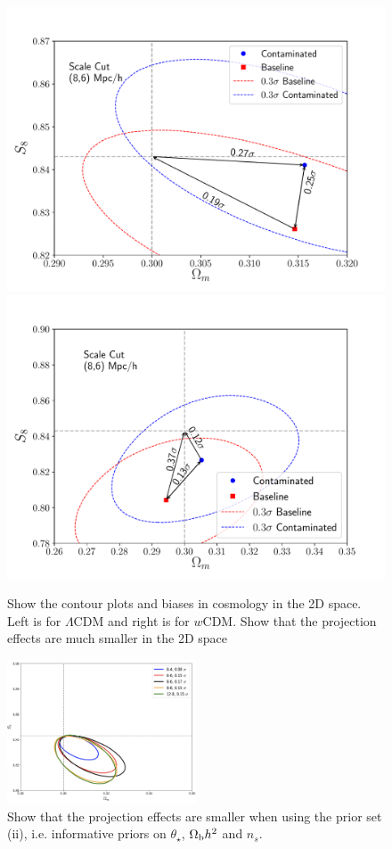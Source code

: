\documentclass[fleqn,usenatbib]{mnras}
\begin{document}
\begin{figure}
\includegraphics[width=\columnwidth]{figs/contour_2x2pt_sc_8_6.pdf}
\includegraphics[width=\columnwidth]{figs/contour_2x2pt_sc_8_6_wcdm.pdf}
\caption[]{Show the contour plots and biases in cosmology in the 2D space. Left is for $\Lambda$CDM and right is for $w$CDM. Show that the projection effects are much smaller in the 2D space}
\label{fig:2d_simlike}
\end{figure}

\begin{figure}
\includegraphics[width=0.5\textwidth,draft]{figs/temp.png}
\caption[]{Show that the projection effects are smaller when using the prior set (ii), i.e. informative priors on $\theta_{\star}$, $\Omega_{\rm b} h^2$ and $n_s$.}
\label{fig:simlike_cosmoprior}
\end{figure}







\bsp	%
\label{lastpage}

% 
%  
\end{document}
